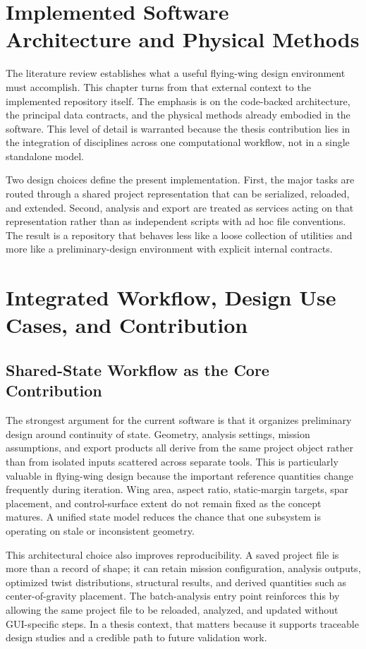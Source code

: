 \documentclass[12pt]{report}
\begin{document}
\chapter{Implemented Software Architecture and Physical Methods}
The literature review establishes what a useful flying-wing design environment must accomplish. This chapter turns from that external context to the implemented repository itself. The emphasis is on the code-backed architecture, the principal data contracts, and the physical methods already embodied in the software. This level of detail is warranted because the thesis contribution lies in the integration of disciplines across one computational workflow, not in a single standalone model.

Two design choices define the present implementation. First, the major tasks are routed through a shared project representation that can be serialized, reloaded, and extended. Second, analysis and export are treated as services acting on that representation rather than as independent scripts with ad hoc file conventions. The result is a repository that behaves less like a loose collection of utilities and more like a preliminary-design environment with explicit internal contracts.



\chapter{Integrated Workflow, Design Use Cases, and Contribution}
\section{Shared-State Workflow as the Core Contribution}
The strongest argument for the current software is that it organizes preliminary design around continuity of state. Geometry, analysis settings, mission assumptions, and export products all derive from the same project object rather than from isolated inputs scattered across separate tools. This is particularly valuable in flying-wing design because the important reference quantities change frequently during iteration. Wing area, aspect ratio, static-margin targets, spar placement, and control-surface extent do not remain fixed as the concept matures. A unified state model reduces the chance that one subsystem is operating on stale or inconsistent geometry.

This architectural choice also improves reproducibility. A saved project file is more than a record of shape; it can retain mission configuration, analysis outputs, optimized twist distributions, structural results, and derived quantities such as center-of-gravity placement. The batch-analysis entry point reinforces this by allowing the same project file to be reloaded, analyzed, and updated without GUI-specific steps. In a thesis context, that matters because it supports traceable design studies and a credible path to future validation work.
\end{document}
